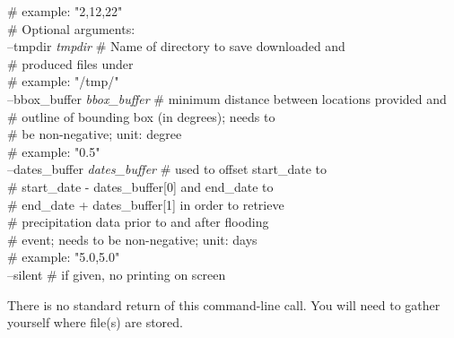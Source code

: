 \documentclass[10pt,a4paper,titlepage,parskip]{scrartcl}
\newenvironment{ttfont}{\fontfamily{\ttdefault}\selectfont}{\par}
\newcommand{\GRAU}[1]{\textcolor{ufzgray2}{#1}}
\begin{document}
\begin{framed}
\begin{ttfont}
\begin{tabbing}
			\> \> \GRAU{\# example: "2,12,22"}\\
			\> \GRAU{\# Optional arguments:}\\
			\> --tmpdir \textit{tmpdir} \> \GRAU{\# Name of directory to save downloaded and}\\
			\> \> \GRAU{\# produced files under}\\
			\> \> \GRAU{\# example: "/tmp/"}\\
			\> --bbox\_buffer \textit{bbox\_buffer} \> \GRAU{\# minimum distance between locations provided and}\\
			\> \> \GRAU{\# outline of bounding box (in degrees); needs to}\\
			\> \> \GRAU{\# be non-negative; unit: degree}\\
			\> \> \GRAU{\# example: "0.5"}\\
			\> --dates\_buffer \textit{dates\_buffer} \> \GRAU{\# used to offset start\_date to}\\
			\> \> \GRAU{\# start\_date - dates\_buffer[0] and end\_date to }\\
			\> \> \GRAU{\# end\_date + dates\_buffer[1] in order to retrieve}\\
			\> \> \GRAU{\# precipitation data prior to and after flooding}\\
			\> \> \GRAU{\# event; needs to be non-negative; unit: days}\\
			\> \> \GRAU{\# example: "5.0,5.0"}\\
			\> --silent \> \GRAU{\# if given, no printing on screen}\\
		\end{tabbing}
	\end{ttfont}
	\vspace*{-0.3cm}
\end{framed}
\vspace*{-0.3cm}
There is no standard return of this command-line call. You will need to gather yourself where file(s) are stored.
\pagebreak
\end{document}
